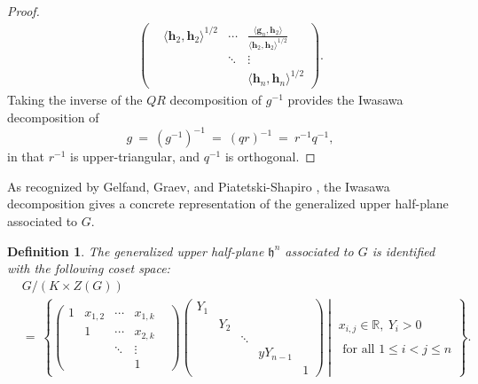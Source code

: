 \documentclass[12pt, reqno, oneside]{amsart}
\newtheorem{definition}[corollary]{Definition}
\numberwithin{equation}{section}
\begin{document}
\begin{proof}
\begin{align}
\begin{pmatrix}
    & \langle \mathbf{h}_2, \mathbf{h}_2 \rangle^{1/2} & \cdots & \frac{\langle \mathbf{g}_n, \mathbf{h}_2 \rangle}{\langle \mathbf{h}_2, \mathbf{h}_2 \rangle^{1/2}} \\
    & & \ddots & \vdots \\
    & & & \langle \mathbf{h}_n, \mathbf{h}_n \rangle^{1/2}
\end{pmatrix}.
\end{align}
Taking the inverse of the $QR$ decomposition of $g^{-1}$ provides the Iwasawa decomposition of 
\begin{equation}
g \ = \ (g^{-1})^{-1} \ = \ (qr)^{-1} \ = \ r^{-1}q^{-1},
\end{equation}
in that $r^{-1}$ is upper-triangular, and $q^{-1}$ is orthogonal. 
\end{proof}

As recognized by Gelfand, Graev, and Piatetski-Shapiro \cite{GGP69}, the Iwasawa decomposition gives a concrete representation of the generalized upper half-plane associated to $G$.  
\begin{definition}\label{def:upper-half-plane}
The generalized upper half-plane $\mathfrak{h}^n$ associated to $G$ is identified with the following coset space:
\begin{align*}
& G / (K \times Z(G)) \\
&= \ \left\{
\left. \left(
\begin{smallmatrix}
1 & x_{1,2} & \cdots & x_{1,k} \\
& 1 & \cdots & x_{2,k} \\
& & \ddots & \vdots & \\
& & & 1
\end{smallmatrix}
\right) 
\left(
\begin{smallmatrix}
Y_1 & & & & \\
& Y_2 & & & \\
& & \ddots & & \\
& & & yY_{n-1} & \\
& & & & 1
\end{smallmatrix}
\right) \ \right| \ 
\substack{x_{i,j} \in \mathbb{R}, \ Y_i > 0 \\ \\ \text{ for all } 1 \leq i < j \leq n}
\right\}.
\end{align*}
\end{definition}
\end{document}
